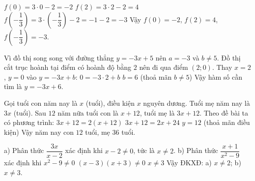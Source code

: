 \begin{problem}[8DS-HSBN-001]
$f(0) = 3 \cdot 0 - 2 = -2$
$f(2) = 3 \cdot 2 - 2 = 4$
$f\left(-\dfrac{1}{3}\right) = 3 \cdot \left(-\dfrac{1}{3}\right) - 2 = -1 - 2 = -3$
Vậy $f(0) = -2$, $f(2) = 4$, $f\left(-\dfrac{1}{3}\right) = -3$.
\end{problem}

\begin{problem}[8DS-HSBN-005]
Vì đồ thị song song với đường thẳng $y = -3x + 5$ nên $a = -3$ và $b \neq 5$.
Đồ thị cắt trục hoành tại điểm có hoành độ bằng $2$ nên đi qua điểm $(2; 0)$.
Thay $x = 2$, $y = 0$ vào $y = -3x + b$: $0 = -3 \cdot 2 + b$
$b = 6$ (thoả mãn $b \neq 5$)
Vậy hàm số cần tìm là $y = -3x + 6$.
\end{problem}

\begin{problem}[8DS-PT1-006]
Gọi tuổi con năm nay là $x$ (tuổi), điều kiện $x$ nguyên dương.
Tuổi mẹ năm nay là $3x$ (tuổi).
Sau $12$ năm nữa tuổi con là $x + 12$, tuổi mẹ là $3x + 12$.
Theo đề bài ta có phương trình: $3x + 12 = 2(x + 12)$
$3x + 12 = 2x + 24$
$y = 12$ (thoả mãn điều kiện)
Vậy năm nay con $12$ tuổi, mẹ $36$ tuổi.
\end{problem}

\begin{problem}[8DS-PS-001]
a) Phân thức $\dfrac{3x}{x - 2}$ xác định khi $x - 2 \neq 0$, tức là $x \neq 2$.
b) Phân thức $\dfrac{x + 1}{x^2 - 9}$ xác định khi $x^2 - 9 \neq 0$
$(x - 3)(x + 3) \neq 0$
$x \neq 3$
Vậy ĐKXĐ: a) $x \neq 2$; b) $x \neq 3$.
\end{problem}
